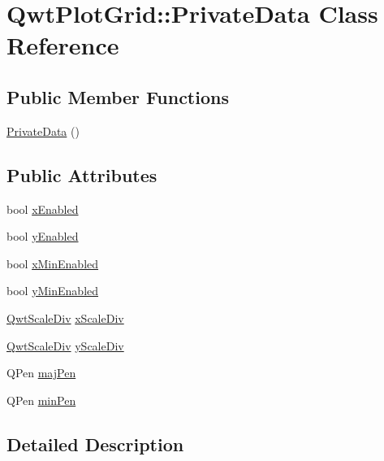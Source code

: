 \hypertarget{class_qwt_plot_grid_1_1_private_data}{\section{Qwt\-Plot\-Grid\-:\-:Private\-Data Class Reference}
\label{class_qwt_plot_grid_1_1_private_data}
}
\subsection*{Public Member Functions}
\begin{DoxyCompactItemize}
\item 
\hyperlink{class_qwt_plot_grid_1_1_private_data_a36f05eb78985f08d378154f8eaa86dcf}{Private\-Data} ()
\end{DoxyCompactItemize}
\subsection*{Public Attributes}
\begin{DoxyCompactItemize}
\item 
bool \hyperlink{class_qwt_plot_grid_1_1_private_data_af51ab508f94f1c30b46a8acb5a0883f4}{x\-Enabled}
\item 
bool \hyperlink{class_qwt_plot_grid_1_1_private_data_ad237c21fc1336a6b00634cfe4d894131}{y\-Enabled}
\item 
bool \hyperlink{class_qwt_plot_grid_1_1_private_data_af33d554ededc86d3129d3217e3e81222}{x\-Min\-Enabled}
\item 
bool \hyperlink{class_qwt_plot_grid_1_1_private_data_aab01ee1677da7d439792d4408564aa64}{y\-Min\-Enabled}
\item 
\hyperlink{class_qwt_scale_div}{Qwt\-Scale\-Div} \hyperlink{class_qwt_plot_grid_1_1_private_data_a184c4c520bc0fc54030c800873aa454c}{x\-Scale\-Div}
\item 
\hyperlink{class_qwt_scale_div}{Qwt\-Scale\-Div} \hyperlink{class_qwt_plot_grid_1_1_private_data_a878c13ccbecec7a5b6a5ee0cffe56afd}{y\-Scale\-Div}
\item 
Q\-Pen \hyperlink{class_qwt_plot_grid_1_1_private_data_a72a46b6798785658e1948554d194bf5b}{maj\-Pen}
\item 
Q\-Pen \hyperlink{class_qwt_plot_grid_1_1_private_data_a64627d5ca4fb6f81b58162ab8fa557de}{min\-Pen}
\end{DoxyCompactItemize}


\subsection{Detailed Description}


